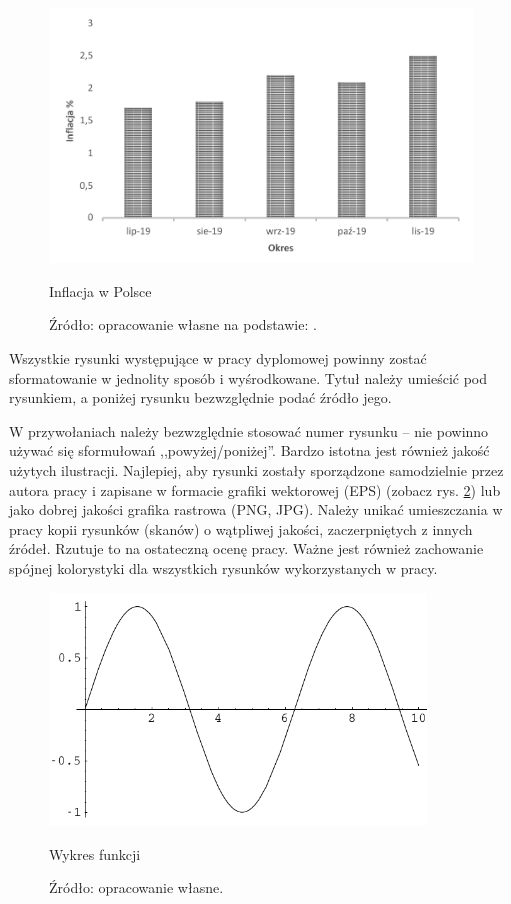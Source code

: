 \begin{figure}[ht]
	\centering
	\includegraphics[width=120mm]{images/inflacja.pdf}
	\caption{Inflacja w Polsce}
	\caption*{Źródło: opracowanie własne na podstawie: \citep{barczak-brezinski}.}
	\label{fig:inflacja}
\end{figure}

Wszystkie rysunki występujące w pracy dyplomowej powinny zostać sformatowanie w jednolity sposób i wyśrodkowane. Tytuł należy umieścić pod rysunkiem, a poniżej rysunku bezwzględnie podać źródło jego.

W przywołaniach należy bezwzględnie stosować numer rysunku -- nie powinno używać się sformułowań ,,powyżej/poniżej''. Bardzo istotna jest również jakość użytych ilustracji. Najlepiej, aby rysunki zostały sporządzone samodzielnie przez autora pracy i zapisane w formacie grafiki wektorowej (EPS) (zobacz rys. \ref{fig:sinusoida}) lub jako dobrej jakości grafika rastrowa (PNG, JPG). Należy unikać umieszczania w pracy kopii rysunków (skanów) o wątpliwej jakości, zaczerpniętych z innych źródeł. Rzutuje to na ostateczną ocenę pracy. Ważne jest również zachowanie spójnej kolorystyki dla wszystkich rysunków wykorzystanych w pracy.

\begin{figure}[ht]
	\centering
	\includegraphics[width=100mm]{images/mathematica.pdf}
	\caption{Wykres funkcji}
	\caption*{Źródło: opracowanie własne.}
	\label{fig:sinusoida}
\end{figure}

